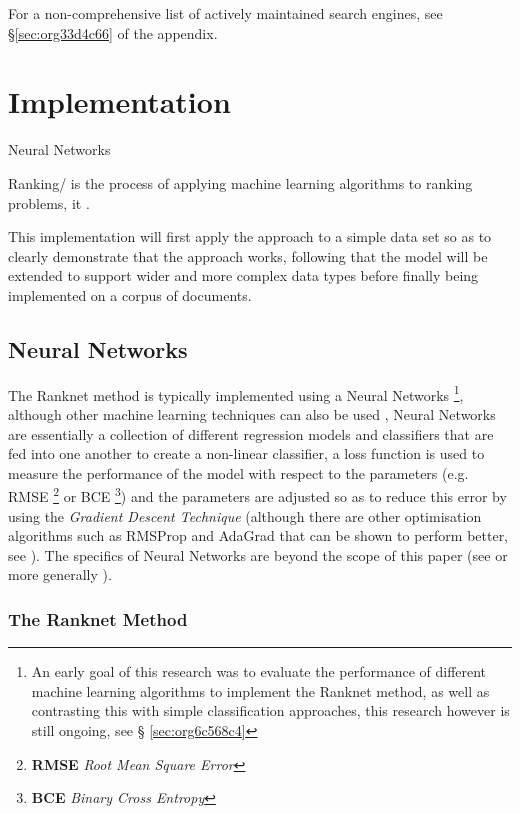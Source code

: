 \documentclass[a4paper,11pt,twoside]{article}
\begin{document}
For a non-comprehensive list of actively maintained search engines,
see \S \ref{sec:org33d4c66} of the appendix.

\section{Implementation}
\label{sec:orgad25dbd}



Neural Networks 

Ranking/ is the process of applying machine learning algorithms to
ranking problems, it .

This implementation will first apply the approach to a simple data
set so as to clearly demonstrate that the approach works, following
that the model will be extended to support wider and more complex
data types before finally being implemented on a corpus of documents.

\subsection{Neural Networks}
\label{sec:org07a7d03}

The Ranknet method is typically implemented using a Neural Networks
\footnote{An early goal of this research was to evaluate the performance
of different machine learning algorithms to implement the Ranknet
method, as well as contrasting this with simple classification
approaches, this research however is still ongoing,  see \S
\ref{sec:org6c568c4}},
although other machine learning techniques can also be used
\cite[p. 1]{christopherburgesRankNetRankingRetrospective2015},
Neural Networks are essentially a collection of different
regression models and classifiers that are fed into one another to create a
non-linear classifier, a loss function is used to measure the
performance of the model with respect to the parameters
(e.g. RMSE \footnote{\textbf{RMSE} \emph{Root Mean Square Error}} or BCE \footnote{\textbf{BCE} \emph{Binary Cross Entropy}}) and the parameters are adjusted so
as to reduce this error by using the \emph{Gradient Descent Technique}
(although there are other optimisation algorithms such as RMSProp
and AdaGrad \cite{mukkamalaVariantsRMSPropAdagrad2017} that can be
shown to perform better, see
\cite{bushaevUnderstandingRMSpropFaster2018}). The specifics of
Neural Networks are beyond the scope of this paper (see
\cite{hmkcodeBackpropagationStepStep} or more generally \cite{pictonNeuralNetworks1994}).

\subsubsection{The Ranknet Method}
\label{sec:org8a67b64}
\end{document}
